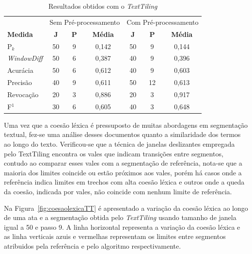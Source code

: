 \begin{table}[!h]
	\centering
	\begin{tabular}{|l||c|c|c||c|c|c|} \hline

		& \multicolumn{3}{c||}{Sem Pré-processamento} 
		& \multicolumn{3}{c|}{Com Pré-processamento}\\			

		\textbf{Medida} & 
		\textbf{J} &
		\textbf{P} & 
		\textbf{Média} &
		\textbf{J} &
		\textbf{P} & 
		\textbf{Média} \\	\hline

		P$_k$				& 50 & 9 & 0,142 & 50 & 9  & 0,144 \\ \hline
		\textit{WindowDiff}	& 50 & 6 & 0,387 & 40 & 9  & 0,396 \\ \hline
		Acurácia			& 50 & 6 & 0,612 & 40 & 9  & 0,603 \\ \hline
		Precisão			& 40 & 9 & 0,611 & 50 & 12 & 0,613 \\ \hline
		Revocação			& 20 & 3 & 0,886 & 20 & 3  & 0,917 \\ \hline
		F$^1$				& 30 & 6 & 0,605 & 40 & 3  & 0,648 \\ \hline

	\end{tabular}
	\caption{Resultados obtidos com o \textit{TextTiling}}
	\label{tab:resultadosTT}
\end{table}






Uma vez que a coesão léxica é pressuposto de muitas abordagens em segmentação textual, fez-se uma análise desses documentos quanto a similaridade dos termos ao longo do texto. Verificou-se que a técnica de janelas deslizantes empregada pelo TextTiling encontra os vales que indicam transições entre segmentos, contudo ao comparar esses vales com a segmentação de referência, nota-se que a maioria dos limites coincide  ou estão próximos aos vales, porém há casos onde a referência indica limites em trechos com alta coesão léxica e outros onde a queda da coesão, indicada por vales, não coincide com nenhum limite de referência. 



Na Figura~\ref{fig:coesaolexicaTT} é apresentado a variação da coesão léxica ao longo de uma ata e a segmentação obtida pelo \textit{TextTiling} usando tamanho de janela igual a 50 e passo 9. A linha horizontal representa a variação da coesão léxica e as linha verticais azuis e vermelhas representam os limites entre segmentos atribuidos pela referência e pelo algoritmo respectivamente. 





